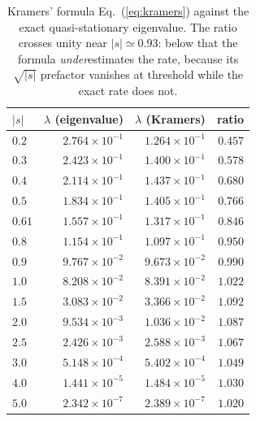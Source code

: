 \begin{table}[b]
\caption{\label{tab:kramers}%
Kramers' formula Eq.~(\ref{eq:kramers}) against the exact quasi-stationary eigenvalue.  The ratio crosses unity near $|s|\simeq0.93$: below that the formula \emph{under}estimates the rate, because its $\sqrt{|s|}$ prefactor vanishes at threshold while the exact rate does not.}
\begin{ruledtabular}
\begin{tabular}{lrrr}
\hline
$|s|$ & $\lambda$ (eigenvalue) & $\lambda$ (Kramers) & ratio \\
\hline
$0.2$ & $2.764\times10^{-1}$ & $1.264\times10^{-1}$ & $0.457$ \\
$0.3$ & $2.423\times10^{-1}$ & $1.400\times10^{-1}$ & $0.578$ \\
$0.4$ & $2.114\times10^{-1}$ & $1.437\times10^{-1}$ & $0.680$ \\
$0.5$ & $1.834\times10^{-1}$ & $1.405\times10^{-1}$ & $0.766$ \\
$0.61$ & $1.557\times10^{-1}$ & $1.317\times10^{-1}$ & $0.846$ \\
$0.8$ & $1.154\times10^{-1}$ & $1.097\times10^{-1}$ & $0.950$ \\
$0.9$ & $9.767\times10^{-2}$ & $9.673\times10^{-2}$ & $0.990$ \\
$1.0$ & $8.208\times10^{-2}$ & $8.391\times10^{-2}$ & $1.022$ \\
$1.5$ & $3.083\times10^{-2}$ & $3.366\times10^{-2}$ & $1.092$ \\
$2.0$ & $9.534\times10^{-3}$ & $1.036\times10^{-2}$ & $1.087$ \\
$2.5$ & $2.426\times10^{-3}$ & $2.588\times10^{-3}$ & $1.067$ \\
$3.0$ & $5.148\times10^{-4}$ & $5.402\times10^{-4}$ & $1.049$ \\
$4.0$ & $1.441\times10^{-5}$ & $1.484\times10^{-5}$ & $1.030$ \\
$5.0$ & $2.342\times10^{-7}$ & $2.389\times10^{-7}$ & $1.020$ \\
\end{tabular}
\end{ruledtabular}
\end{table}
